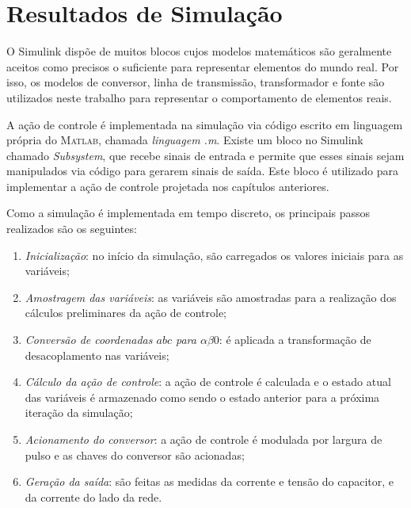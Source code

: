 \section{Resultados de Simulação}


  O Simulink dispõe de muitos blocos cujos modelos matemáticos são geralmente aceitos como precisos o suficiente para representar elementos do mundo real. Por isso, os modelos de conversor, linha de transmissão, transformador e fonte são utilizados neste trabalho para representar o comportamento de elementos reais.

	A ação de controle é implementada na simulação via código escrito em linguagem própria do \textsc{Matlab}, chamada \textit{linguagem .m}. Existe um bloco no Simulink chamado \textit{Subsystem}, que recebe sinais de entrada e permite que esses sinais sejam manipulados via código para gerarem sinais de saída. Este bloco é utilizado para implementar a ação de controle projetada nos capítulos anteriores.

	Como a simulação é implementada em tempo discreto, os principais passos realizados são os seguintes:

	\begin{enumerate}
		\item \textit{Inicialização}: no início da simulação, são carregados os valores iniciais para as variáveis;
		\item \textit{Amostragem das variáveis}: as variáveis são amostradas para a realização dos cálculos preliminares da ação de controle;
    \item \textit{Conversão de coordenadas $abc$ para $\alpha \beta 0$}: é aplicada a transformação de desacoplamento nas variáveis;
		\item \textit{Cálculo da ação de controle}: a ação de controle é calculada e o estado atual das variáveis é armazenado como sendo o estado anterior para a próxima iteração da simulação;
    \item \textit{Acionamento do conversor}: a ação de controle é modulada por largura de pulso e as chaves do conversor são acionadas;
		\item \textit{Geração da saída}: são feitas as medidas da corrente e tensão do capacitor, e da corrente do lado da rede.
	\end{enumerate}

